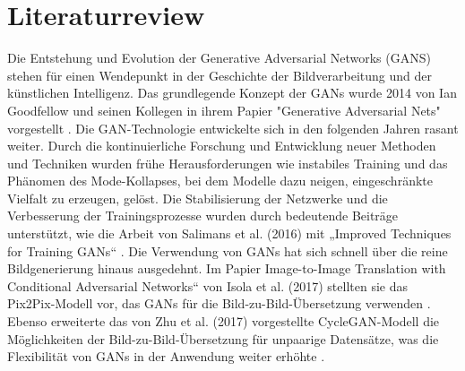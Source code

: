 \chapter{Literaturreview}

Die Entstehung und Evolution der Generative Adversarial Networks (GANS) stehen für einen Wendepunkt in der Geschichte der Bildverarbeitung und der künstlichen Intelligenz. Das grundlegende Konzept der GANs wurde 2014 von Ian Goodfellow und seinen Kollegen in ihrem Papier "Generative Adversarial Nets" vorgestellt \cite{Goodfellow2014}.\newline
Die GAN-Technologie entwickelte sich in den folgenden Jahren rasant weiter. Durch die kontinuierliche Forschung und Entwicklung neuer Methoden und Techniken wurden frühe Herausforderungen wie instabiles Training und das Phänomen des Mode-Kollapses, bei dem Modelle dazu neigen, eingeschränkte Vielfalt zu erzeugen, gelöst. Die Stabilisierung der Netzwerke und die Verbesserung der Trainingsprozesse wurden durch bedeutende Beiträge unterstützt, wie die Arbeit von Salimans et al. (2016) mit „Improved Techniques for Training GANs“ \cite{Salimans.2016}. \newline
Die Verwendung von GANs hat sich schnell über die reine Bildgenerierung hinaus ausgedehnt. Im Papier Image-to-Image Translation with Conditional Adversarial Networks“ von Isola et al. (2017) stellten sie das Pix2Pix-Modell vor, das GANs für die Bild-zu-Bild-Übersetzung verwenden \cite{PhillipIsola.}. Ebenso erweiterte das von Zhu et al. (2017) vorgestellte CycleGAN-Modell die Möglichkeiten der Bild-zu-Bild-Übersetzung für unpaarige Datensätze, was die Flexibilität von GANs in der Anwendung weiter erhöhte \cite{Zhu.2017}. \newline
